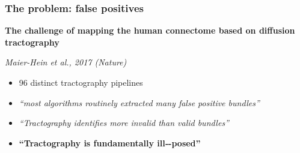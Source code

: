 \documentclass[aspectratio=169]{beamer}
\begin{document}
		\begin{frame}
		\frametitle{The problem: false positives}
		\begin{center}
		\textbf{The challenge of mapping the human connectome based on diffusion tractography}
		\end{center}
		\begin{flushright}
		\emph{Maier-Hein et al., 2017 (Nature)}
		\end{flushright}
		
		\begin{itemize}
		\item 96 distinct tractography pipelines
		\item \emph{``most algorithms routinely extracted many false positive bundles''}
		\item \emph{``Tractography identifies more invalid than valid bundles''}
		\item \textbf{``Tractography is fundamentally ill‐-posed''}
		\end{itemize}
		\end{frame}
		
\end{document}
